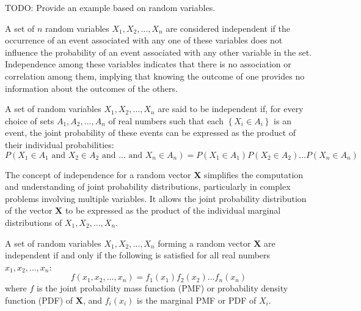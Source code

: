 \begin{example}
{\color{red} TODO: Provide an example based on random variables.}
\end{example}

A set of $n$ random variables $X_1, X_2, \ldots, X_n$ are considered independent if the occurrence of an event associated with any one of these variables does not influence the probability of an event associated with any other variable in the set. Independence among these variables indicates that there is no association or correlation among them, implying that knowing the outcome of one provides no information about the outcomes of the others.

\begin{definition}
A set of random variables $X_1, X_2, \ldots, X_n$ are said to be independent if, for every choice of sets $A_1, A_2, \ldots, A_n$ of real numbers such that each $\left\{ X_i \in A_i \right\}$ is an event, the joint probability of these events can be expressed as the product of their individual probabilities:
\[
P\left(X_1 \in A_1 \text{ and } X_2 \in A_2 \text{ and } \ldots \text{ and } X_n \in A_n\right) = P\left(X_1 \in A_1\right)P\left(X_2 \in A_2\right)\ldots P\left(X_n \in A_n\right)
\]
\end{definition}

The concept of independence for a random vector $\mathbf{X}$ simplifies the computation and understanding of joint probability distributions, particularly in complex problems involving multiple variables. It allows the joint probability distribution of the vector $\mathbf{X}$ to be expressed as the product of the individual marginal distributions of $X_1, X_2, \ldots, X_n$. 

\begin{proposition}
A set of random variables \(X_1, X_2, \ldots, X_n\) forming a random vector \(\mathbf{X}\) are independent if and only if the following is satisfied for all real numbers \(x_1, x_2, \ldots, x_n\): 
\[
f\left(x_1, x_2, \ldots, x_n\right) = f_1\left(x_1\right) f_2\left(x_2\right) \ldots f_n\left(x_n\right)
\]
where \(f\) is the joint probability mass function (PMF) or probability density function (PDF) of \(\mathbf{X}\), and \(f_i(x_i)\) is the marginal PMF or PDF of \(X_i\).
\end{proposition}

